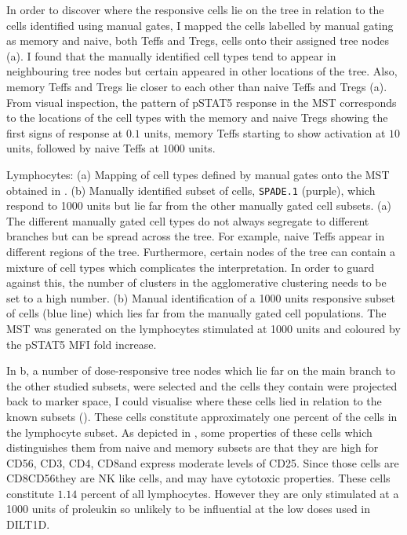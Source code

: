 In order to discover where the responsive cells lie on the tree in relation to the cells identified using manual gates, I mapped
the cells labelled by manual gating as memory and naive, both Teffs and Tregs, cells onto their assigned tree nodes (a).
I found that the manually identified cell types tend to appear in neighbouring tree nodes but certain appeared in other locations of the tree.
Also, memory Teffs and Tregs lie closer to each other than naive Teffs and Tregs (a).
From visual inspection, the pattern of pSTAT5 response in the \gls{MST} corresponds to the locations of the cell types
with the memory and naive Tregs showing the first signs of response at $0.1$ units, memory Teffs starting to show activation at $10$ units,
followed by naive Teffs at $1000$ units.

{ Lymphocytes:
  (a) Mapping of cell types defined by manual gates onto the \gls{MST} obtained in .
  (b) Manually identified subset of cells, \texttt{SPADE.1} (purple), which respond to 1000 units but lie far from the other manually gated cell subsets.
}
{
  (a)
  The different manually gated cell types do not always segregate to different branches but can be spread across the tree.
  For example, naive Teffs appear in different regions of the tree.
  Furthermore, certain nodes of the tree can contain a mixture of cell types which complicates the interpretation.
  In order to guard against this, the number of clusters in the agglomerative clustering needs to be set to a high number.
  (b)
  Manual identification of a 1000 units responsive subset of cells (blue line) which lies far from the manually gated cell populations.
  The \gls{MST} was generated on the lymphocytes stimulated at 1000 units and coloured by the pSTAT5 MFI fold increase.
}

In b, a number of dose-responsive tree nodes which lie far on the main branch to the other studied subsets,
were selected and the cells they contain were projected back to marker space, I could visualise where these cells lied in relation to the
known subsets ().
These cells constitute approximately one percent of the cells in the lymphocyte subset.
As depicted in , some properties of these cells which distinguishes them from 
naive and memory subsets are that they are high for CD56, CD3\negative, CD4\negative, CD8\positive and express moderate levels of CD25.
Since those cells are CD8\positive CD56\positive they are \gls{NK} like cells, and may have cytotoxic properties.
These cells constitute $1.14$ percent of all lymphocytes.
However they are only stimulated at a 1000 units of proleukin so unlikely to be influential at the low doses used in DILT1D.

